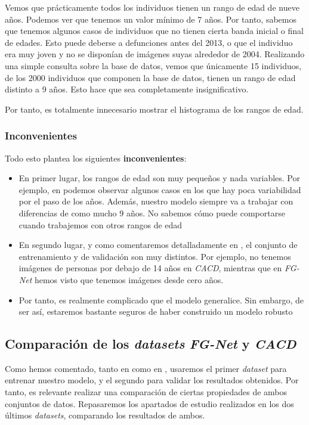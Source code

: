 Vemos que prácticamente todos los individuos tienen un rango de edad de nueve años. Podemos ver que tenemos un valor mínimo de 7 años. Por tanto, sabemos que tenemos algunos casos de individuos que no tienen cierta banda inicial o final de edades. Esto puede deberse a defunciones antes del 2013, o que el individuo era muy joven y no se disponían de imágenes suyas alrededor de 2004. Realizando una simple consulta sobre la base de datos, vemos que únicamente 15 individuos, de los 2000 individuos que componen la base de datos, tienen un rango de edad distinto a 9 años. Esto hace que sea completamente insignificativo.

Por tanto, es totalmente innecesario mostrar el histograma de los rangos de edad.

\subsubsection{Inconvenientes}

Todo esto plantea los siguientes \textbf{inconvenientes}:

\begin{itemize}
    \item En primer lugar, los rangos de edad son muy pequeños y nada variables. Por ejemplo, en  podemos observar algunos casos en los que hay poca variabilidad por el paso de los años. Además, nuestro modelo siempre va a trabajar con diferencias de como mucho 9 años. No sabemos cómo puede comportarse cuando trabajemos con otros rangos de edad
    \item En segundo lugar, y como comentaremos detalladamente en , el conjunto de entrenamiento y de validación son muy distintos. Por ejemplo, no tenemos imágenes de personas por debajo de 14 años en \textit{CACD}, mientras que en \textit{FG-Net} hemos visto que tenemos imágenes desde cero años.
    \item Por tanto, es realmente complicado que el modelo generalice. Sin embargo, de ser así, estaremos bastante seguros de haber construido un modelo robusto
\end{itemize}

\subsection{Comparación de los \textit{datasets} \textit{FG-Net} y \textit{CACD}} \label{isec:comparaciones_datasets}

Como hemos comentado, tanto en  como en , usaremos el primer \textit{dataset} para entrenar nuestro modelo, y el segundo para validar los resultados obtenidos. Por tanto, es relevante realizar una comparación de ciertas propiedades de ambos conjuntos de datos. Repasaremos los apartados de estudio realizados en los dos últimos \textit{datasets}, comparando los resultados de ambos.


